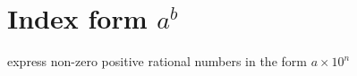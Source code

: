 



\section{Index form $a^b$}

express non-zero positive rational
numbers in the form
$a\times 10^n$

